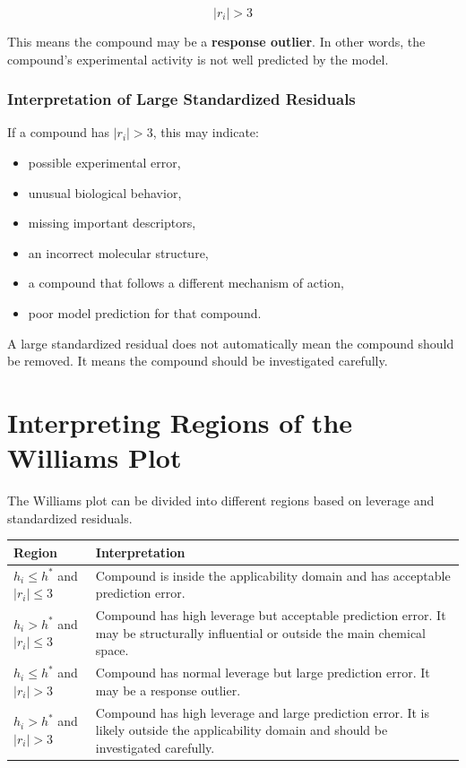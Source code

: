 \documentclass[11pt]{report}
\newenvironment{Important note}{\begin{quote}\color{red}\textbf{Important note:} }{\end{quote}}
\begin{document}
\[
|r_i| > 3
\]

This means the compound may be a \textbf{response outlier}. In other words, the compound's experimental activity is not well predicted by the model.

\subsubsection*{Interpretation of Large Standardized Residuals}

If a compound has $|r_i| > 3$, this may indicate:

\begin{itemize}[leftmargin=*]
    \item possible experimental error,
    \item unusual biological behavior,
    \item missing important descriptors,
    \item an incorrect molecular structure,
    \item a compound that follows a different mechanism of action,
    \item poor model prediction for that compound.
\end{itemize}

A large standardized residual does not automatically mean the compound should be removed. It means the compound should be investigated carefully.

\section{Interpreting Regions of the Williams Plot}

The Williams plot can be divided into different regions based on leverage and standardized residuals.

\begin{center}
\begin{tabular}{p{}p{}}
\toprule
\textbf{Region} & \textbf{Interpretation} \\
\midrule
$h_i \leq h^*$ and $|r_i| \leq 3$ & Compound is inside the applicability domain and has acceptable prediction error. \\
$h_i > h^*$ and $|r_i| \leq 3$ & Compound has high leverage but acceptable prediction error. It may be structurally influential or outside the main chemical space. \\
$h_i \leq h^*$ and $|r_i| > 3$ & Compound has normal leverage but large prediction error. It may be a response outlier. \\
$h_i > h^*$ and $|r_i| > 3$ & Compound has high leverage and large prediction error. It is likely outside the applicability domain and should be investigated carefully. \\
\bottomrule
\end{tabular}
\end{center}
\end{document}
